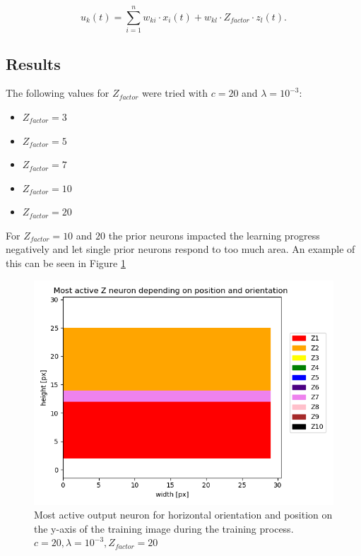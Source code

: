 \begin{equation}
\label{eqn:ukHorvert}
u_k(t) = \sum_{i=1}^n w_{ki} \cdot x_i(t) + w_{kl} \cdot Z_{factor} \cdot z_l(t).
\end{equation}

\subsection{Results} 

The following values for $Z_{factor} $ were tried with $c = 20$ and $\lambda = 10^{-3}$:
\begin{itemize}
  \item $Z_{factor} = 3$
  \item $Z_{factor} = 5$
  \item $Z_{factor} = 7$  
  \item $Z_{factor} = 10$ 
  \item $Z_{factor} = 20$
\end{itemize}

For $Z_{factor} = 10$ and $20$ the prior neurons impacted the learning progress negatively and let single prior neurons respond to too much area. An example of this can be seen in Figure \ref{fig:horvert_c20_3_Zfactor20_horizontalLines}

\begin{figure}
  \includegraphics[width=\linewidth]{figures/horvert/horvert_c20_3_Zfactor20_horizontalLines.png}
  \caption{Most active output neuron for horizontal orientation and position on the y-axis of the training image during the training process. $c = 20, \lambda = 10^{-3}, Z_{factor} = 20$}
  \label{fig:horvert_c20_3_Zfactor20_horizontalLines}
\end{figure}


